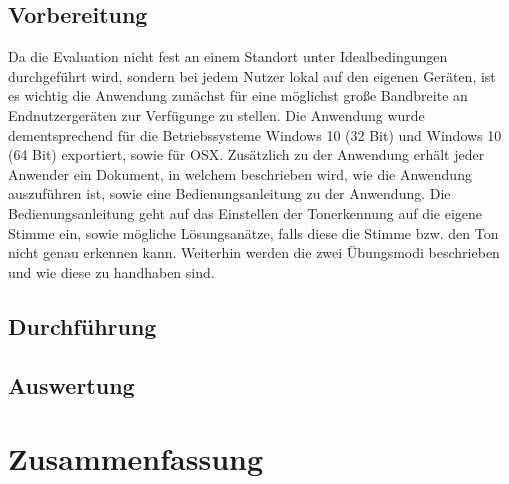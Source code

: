 \section{Vorbereitung}
Da die Evaluation nicht fest an einem Standort unter Idealbedingungen durchgeführt wird, sondern bei jedem Nutzer lokal auf den eigenen Geräten, ist es wichtig die Anwendung zunächst für eine möglichst große Bandbreite an Endnutzergeräten zur Verfügunge zu stellen. Die Anwendung wurde dementsprechend für die Betriebssysteme Windows 10 (32 Bit) und Windows 10 (64 Bit) exportiert, sowie für OSX. Zusätzlich zu der Anwendung erhält jeder Anwender ein Dokument, in welchem beschrieben wird, wie die Anwendung auszuführen ist, sowie eine Bedienungsanleitung zu der Anwendung. Die Bedienungsanleitung geht auf das Einstellen der Tonerkennung auf die eigene Stimme ein, sowie mögliche Lösungsanätze, falls diese die Stimme bzw. den Ton nicht genau erkennen kann. Weiterhin werden die zwei Übungsmodi beschrieben und wie diese zu handhaben sind.  
\section{Durchführung}
\section{Auswertung}


\chapter{Zusammenfassung}


